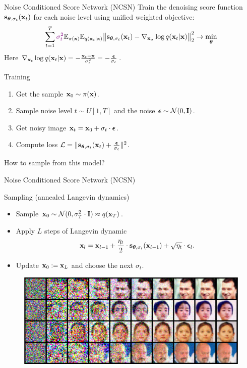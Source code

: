 \begin{frame}{Noise Conditioned Score Network (NCSN)}
	Train the denoising score function $\mathbf{s}_{\boldsymbol{\theta}, \sigma_t}(\mathbf{x}_t)$ for each noise level using unified weighted objective:
	\vspace{-0.2cm}
	\[
		\sum_{t=1}^T {\color{violet}\sigma_t^2} \mathbb{E}_{\pi(\mathbf{x})} \mathbb{E}_{q(\mathbf{x}_t | \mathbf{x})}\bigl\| \mathbf{s}_{\boldsymbol{\theta}, \sigma_t}(\mathbf{x}_t) - \nabla_{\mathbf{x}_{\sigma}} \log q(\mathbf{x}_t | \mathbf{x}) \bigr\|^2_2 \rightarrow \min_{\boldsymbol{\theta}}
	\]
	Here $\nabla_{\mathbf{x}_t} \log q(\mathbf{x}_t | \mathbf{x}) = - \frac{\mathbf{x}_t - \mathbf{x}}{\sigma_t^2} = - \frac{\boldsymbol{\epsilon}}{\sigma_t}$.
	\begin{block}{Training}
		\begin{enumerate}
			\item Get the sample $\mathbf{x}_0 \sim \pi(\mathbf{x})$.
			\item Sample noise level $t \sim U[1, T]$ and the noise $\boldsymbol{\epsilon} \sim \mathcal{N}(0, \mathbf{I})$.
			\item Get noisy image $\mathbf{x}_t = \mathbf{x}_0 + \sigma_t \cdot \boldsymbol{\epsilon}$.
			\item Compute loss $ \mathcal{L} = \| \mathbf{s}_{\boldsymbol{\theta}, \sigma_t}(\mathbf{x}_t) + \frac{\boldsymbol{\epsilon}}{\sigma_t} \|^2 $.
		\end{enumerate}
	\end{block}
	How to sample from this model?
\end{frame}
\begin{frame}{Noise Conditioned Score Network (NCSN)}
	\begin{block}{Sampling (annealed Langevin dynamics)}
		\begin{itemize}
			\item Sample $\mathbf{x}_0 \sim \mathcal{N}(0, \sigma_T^2 \cdot \mathbf{I}) \approx q(\mathbf{x}_T)$.
			\item Apply $L$ steps of Langevin dynamic
			\vspace{-0.2cm}
			\[
				\mathbf{x}_l = \mathbf{x}_{l-1} + \frac{\eta_t}{2} \cdot \mathbf{s}_{\boldsymbol{\theta}, \sigma_t}(\mathbf{x}_{l - 1}) + \sqrt{\eta_t} \cdot \boldsymbol{\epsilon}_l.
			\] 
			\vspace{-0.5cm}
			\item Update $\mathbf{x}_0 := \mathbf{x}_L$ and choose the next $\sigma_t$.
		\end{itemize}
	\end{block}
	\begin{figure}
		\includegraphics[width=0.9\linewidth]{figs/ald}
	\end{figure}
\end{frame}

